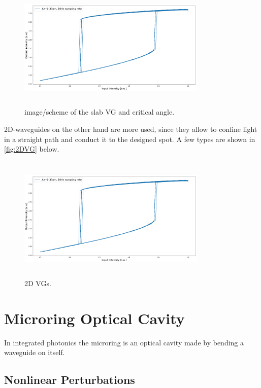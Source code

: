 \begin{figure}[ht]
	\centering
	\includegraphics[draft,width=9cm,height=6cm]{figures/foo.png}
	\caption{image/scheme of the slab VG and critical angle.}
	\label{fig:slabVG}
\end{figure}

2D-waveguides on the other hand are more used, since they allow to confine light in a straight path and conduct it to the designed spot.
A few types are shown in \autoref{fig:2DVG} below.

\begin{figure}[ht]
	\centering
	\includegraphics[draft,width=9cm,height=6cm]{figures/foo.png}
	\caption{2D VGs.}
	\label{fig:2DVG}
\end{figure}

\section{Microring Optical Cavity}
\label{sec:Microring_Optical_Cavity}
In integrated photonics the microring is an optical cavity made by bending a waveguide on itself.

\subsection{Nonlinear Perturbations}
\label{ssec:Nonlinear_Perturbations}


